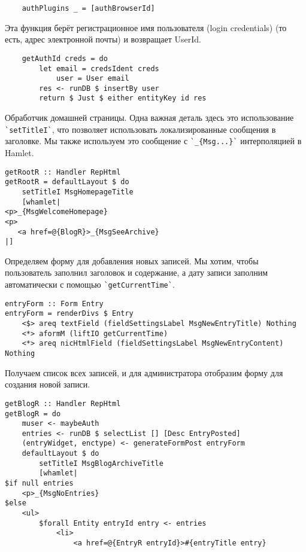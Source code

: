 \begin{lstlisting}
    authPlugins _ = [authBrowserId]
\end{lstlisting}
 
Эта функция берёт регистрационное имя пользователя (login credentials) (то есть, адрес электронной почты) и возвращает UserId. 
 
\begin{lstlisting}
    getAuthId creds = do
        let email = credsIdent creds
            user = User email
        res <- runDB $ insertBy user
        return $ Just $ either entityKey id res
\end{lstlisting}
 
Обработчик домашней страницы. Одна важная деталь здесь это использование \lstinline'`setTitleI`', что позволяет использовать локализированные сообщения в заголовке. Мы также используем это сообщение с \lstinline'`_{Msg...}`' интерполяцией в Hamlet. 
 
\begin{lstlisting}
getRootR :: Handler RepHtml
getRootR = defaultLayout $ do
    setTitleI MsgHomepageTitle
    [whamlet|
<p>_{MsgWelcomeHomepage}
<p>
   <a href=@{BlogR}>_{MsgSeeArchive}
|]
\end{lstlisting}
 
Определяем форму для добавления новых записей. Мы хотим, чтобы пользователь заполнил заголовок и содержание, а дату записи заполним автоматически с помощью \lstinline'`getCurrentTime`'. 
 
\begin{lstlisting}
entryForm :: Form Entry
entryForm = renderDivs $ Entry
    <$> areq textField (fieldSettingsLabel MsgNewEntryTitle) Nothing
    <*> aformM (liftIO getCurrentTime)
    <*> areq nicHtmlField (fieldSettingsLabel MsgNewEntryContent) Nothing
\end{lstlisting}
 
Получаем список всех записей, и для администратора отобразим форму для создания новой записи. 
 
\begin{lstlisting}
getBlogR :: Handler RepHtml
getBlogR = do
    muser <- maybeAuth
    entries <- runDB $ selectList [] [Desc EntryPosted]
    (entryWidget, enctype) <- generateFormPost entryForm
    defaultLayout $ do
        setTitleI MsgBlogArchiveTitle
        [whamlet|
$if null entries
    <p>_{MsgNoEntries}
$else
    <ul>
        $forall Entity entryId entry <- entries
            <li>
                <a href=@{EntryR entryId}>#{entryTitle entry}
\end{lstlisting}
 
